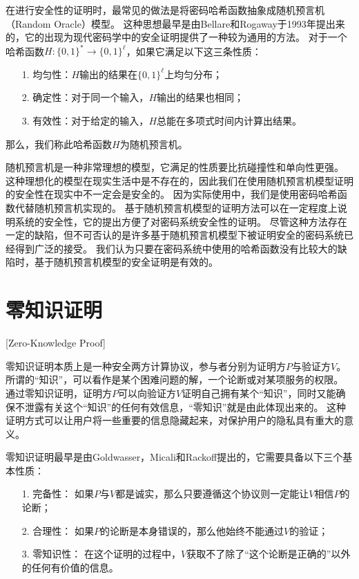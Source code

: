 在进行安全性的证明时，最常见的做法是将密码哈希函数抽象成随机预言机（Random Oracle）模型。
这种思想最早是由Bellare和Rogaway于1993年提出来的\cite{bellare1993random}，它的出现为现代密码学中的安全证明提供了一种较为通用的方法。
对于一个哈希函数$H:\{0,1\}^*\rightarrow\{0,1\}^\ell$，如果它满足以下这三条性质：
\begin{itemize}
  \item[1.] 均匀性：$H$输出的结果在$\{0,1\}^\ell$上均匀分布；
  \item[2.] 确定性：对于同一个输入，$H$输出的结果也相同；
  \item[3.] 有效性：对于给定的输入，$H$总能在多项式时间内计算出结果。
\end{itemize}
那么，我们称此哈希函数$H$为随机预言机。

随机预言机是一种非常理想的模型，它满足的性质要比抗碰撞性和单向性更强。
这种理想化的模型在现实生活中是不存在的，因此我们在使用随机预言机模型证明的安全性在现实中不一定会是安全的。
因为实际使用中，我们是使用密码哈希函数代替随机预言机实现的。
基于随机预言机模型的证明方法可以在一定程度上说明系统的安全性，它的提出方便了对密码系统安全性的证明。
尽管这种方法存在一定的缺陷，但不可否认的是许多基于随机预言机模型下被证明安全的密码系统已经得到广泛的接受\cite{koblitz2015random}。
我们认为只要在密码系统中使用的哈希函数没有比较大的缺陷时，基于随机预言机模型的安全证明是有效的。

\section{零知识证明}[Zero-Knowledge Proof]

零知识证明本质上是一种安全两方计算协议，参与者分别为证明方$P$与验证方$V$。
所谓的“知识”，可以看作是某个困难问题的解，一个论断或对某项服务的权限。
通过零知识证明，证明方$P$可以向验证方$V$证明自己拥有某个“知识”，同时又能确保不泄露有关这个“知识”的任何有效信息，“零知识”就是由此体现出来的。
这种证明方式可以让用户将一些重要的信息隐藏起来，对保护用户的隐私具有重大的意义。

零知识证明最早是由Goldwasser，Micali和Rackoff提出的\cite{goldwasser1989knowledge}，它需要具备以下三个基本性质：
\begin{itemize}
  \item[1.] 完备性： 如果$P$与$V$都是诚实，那么只要遵循这个协议则一定能让$V$相信$P$的论断；
  \item[2.] 合理性： 如果$P$的论断是本身错误的，那么他始终不能通过$V$的验证；
  \item[3.] 零知识性： 在这个证明的过程中，$V$获取不了除了“这个论断是正确的”以外的任何有价值的信息。
\end{itemize}


